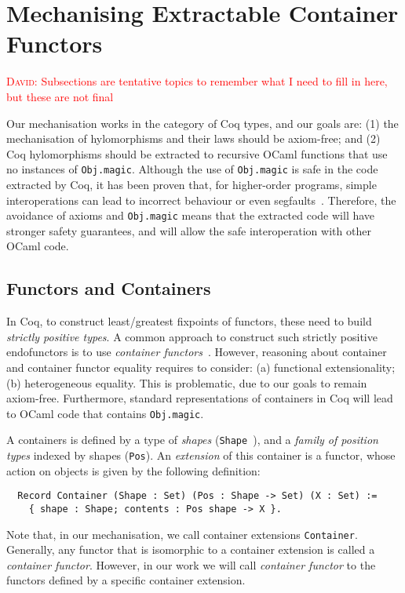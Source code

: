 \documentclass{article}
\newcommand{\dcas}[1]{\textcolor{red}{\textsc{David}: #1}}
\begin{document}
\section{Mechanising Extractable Container Functors}

\dcas{Subsections are tentative topics to remember what I need to fill in here,
but these are not final}

Our mechanisation works in the category of Coq types, and our goals are: (1)
the mechanisation of hylomorphisms and their laws should be axiom-free; and (2)
Coq hylomorphisms should be extracted to recursive OCaml functions that use no
instances of \texttt{Obj.magic}.  Although the use of
\texttt{Obj.magic} is safe in the code extracted by Coq, it has been
proven that, for higher-order programs, simple interoperations can lead to
incorrect behaviour or even segfaults~\cite{forster:hal-04329663}.  Therefore,
the avoidance of axioms and  \texttt{Obj.magic} means that the
extracted code will have stronger safety guarantees, and will allow the safe
interoperation with other OCaml code.

\subsection{Functors and Containers}

In Coq, to construct least/greatest fixpoints of functors, these need to build
\emph{strictly positive types}. A common approach to construct such strictly
positive endofunctors is to use \emph{container functors}~\cite{Whatever}.
However, reasoning about container and container functor equality requires to
consider: (a) functional extensionality; (b) heterogeneous equality. This is
problematic, due to our goals to remain axiom-free. Furthermore, standard
representations of containers in Coq will lead to OCaml code that contains
\texttt{Obj.magic}.

A containers is defined by a type of \emph{shapes} (\texttt{Shape }),
and a \emph{family of position types} indexed by shapes
(\texttt{Pos}).  An \emph{extension} of this container is a functor,
whose action on objects is given by the following definition:
\begin{verbatim}
  Record Container (Shape : Set) (Pos : Shape -> Set) (X : Set) :=
    { shape : Shape; contents : Pos shape -> X }.
\end{verbatim}
Note that, in our mechanisation, we call container extensions
\texttt{Container}. Generally, any functor that is isomorphic to a
container extension is called a \emph{container functor}. However, in our work
we will call \emph{container functor} to the functors defined by a specific
container extension.
\end{document}
